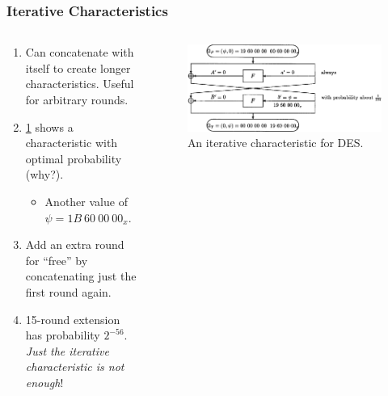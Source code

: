\documentclass{beamer}
\begin{document}
    \begin{frame}
        \frametitle{Iterative Characteristics}
        \begin{columns}
            \begin{column}{0.6\linewidth}
                \begin{enumerate}
                    \item<1-> Can concatenate with itself to create longer
                    characteristics. Useful for arbitrary rounds.
                    \item<2-> \cref{fig:des-iter-char} shows a characteristic
                    with optimal probability (why?).
                    \begin{itemize}
                        \item<3-> Another value of \(\psi = 1B\ 60\ 00\ 00_x\).
                    \end{itemize}
                    \item<4-> Add an extra round for ``free'' by concatenating
                    just the first round again.
                    \item<5-> 15-round extension has probability \(2^{-56}\).
                    \emph{Just the iterative characteristic is not enough}!
                \end{enumerate}
            \end{column}
            \begin{column}{0.4\linewidth}
                \begin{figure}[!ht]
                    \centering
                    \includegraphics[width=\columnwidth]{images/des_iter_char.png}
                    \caption{An iterative characteristic for DES.}
                    \label{fig:des-iter-char}
                \end{figure}
            \end{column}
        \end{columns}
    \end{frame}
\end{document}
